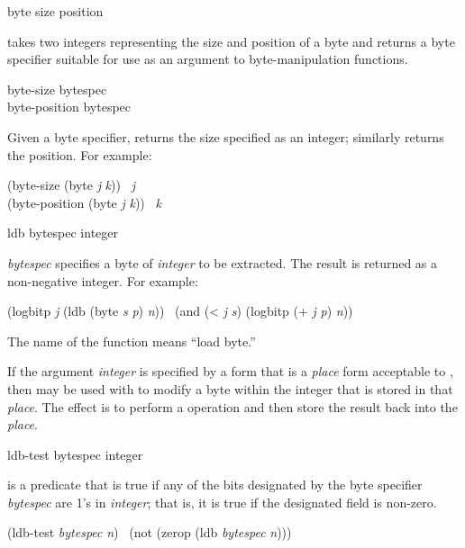 \begin{defun}[Function]
byte size position

 takes two integers representing the size and position
of a byte and returns a byte specifier suitable for use
as an argument to byte-manipulation functions.
\end{defun}

\begin{defun}[Function]
byte-size bytespec \\
byte-position bytespec

Given a byte specifier,  returns the size specified as an
integer;  similarly returns the position.
For example:
\begin{lisp}
(byte-size (byte \emph{j} \emph{k})) \EQ\ \emph{j} \\
(byte-position (byte \emph{j} \emph{k})) \EQ\ \emph{k}
\end{lisp}
\end{defun}

\begin{defun}[Function]
ldb bytespec integer

\emph{bytespec} specifies a byte of \emph{integer} to be extracted.
The result is returned as a non-negative integer.
For example:
\begin{lisp}
(logbitp \emph{j} (ldb (byte \emph{s} \emph{p}) \emph{n})) \EQ\ (and (< \emph{j} \emph{s}) (logbitp (+ \emph{j} \emph{p}) \emph{n}))
\end{lisp}
The name of the function  means ``load byte.''

If the argument \emph{integer} is specified by a form that is a \emph{place} form
acceptable to , then
 may be used with  to modify
a byte within the integer that is stored
in that \emph{place}.
The effect is to perform a  operation
and then store the result back into the \emph{place}.
\end{defun}

\begin{defun}[Function]
ldb-test bytespec integer

 is a predicate that is true if any of
the bits designated by the byte specifier \emph{bytespec} are 1's in \emph{integer};
that is, it is true if the designated field is non-zero.
\begin{lisp}
(ldb-test \emph{bytespec} \emph{n}) \EQ\ (not (zerop (ldb \emph{bytespec} \emph{n})))
\end{lisp}
\end{defun}

